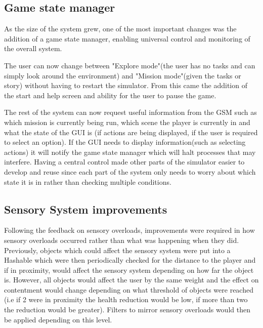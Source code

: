 \documentclass[11pt]{report}
\begin{document}
\subsection{Game state manager}

As the size of the system grew, one of the most important changes was the addition of a game state manager, enabling universal control and monitoring of the overall system. 

The user can now change between "Explore mode"(the user has no tasks and can simply look around the environment) and "Mission mode"(given the tasks or story) without having to restart the simulator. From this came the addition of the start and help screen and ability for the user to pause the game.  

The rest of the system can now request useful information from the GSM such as which mission is currently being run, which scene the player is currently in and what the state of the GUI is (if actions are being displayed, if the user is required to select an option). If the GUI needs to display information(such as selecting actions) it will notify the game state manager which will halt processes that may interfere. Having a central control made other parts of the simulator easier to develop and reuse since each part of the system only needs to worry about which state it is in rather than checking multiple conditions.

\subsection{Sensory System improvements}
Following the feedback on sensory overloads, improvements were required in how sensory overloads occurred rather than what was happening when they did. Previously, objects which could affect the sensory system were put into a Hashable which were then periodically checked for the distance to the player and if in proximity, would affect the sensory system depending on how far the object is. However, all objects would affect the user by the same weight and the effect on contentment would change depending on what threshold of objects were reached (i.e if 2 were in proximity the health reduction would be low, if more than two the reduction would be greater). Filters to mirror sensory overloads would then be applied depending on this level.
\end{document}
